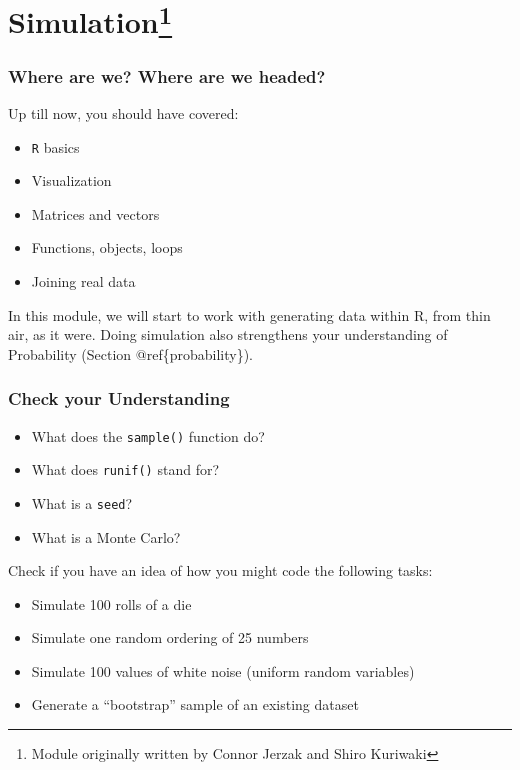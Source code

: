 \documentclass[]{book}
\providecommand{\tightlist}{%
  \setlength{\itemsep}{0pt}\setlength{\parskip}{0pt}}
\let\rmarkdownfootnote\footnote%
\def\footnote{\protect\rmarkdownfootnote}
\theoremstyle{definition}
\theoremstyle{definition}
\theoremstyle{definition}
\theoremstyle{remark}
\begin{document}
\chapter[Simulation]{\texorpdfstring{Simulation\footnote{Module
  originally written by Connor Jerzak and Shiro Kuriwaki}}{Simulation}}\label{simulation}

\subsection*{Where are we? Where are we
headed?}\label{where-are-we-where-are-we-headed-5}

Up till now, you should have covered:

\begin{itemize}
\tightlist
\item
  \texttt{R} basics
\item
  Visualization
\item
  Matrices and vectors
\item
  Functions, objects, loops
\item
  Joining real data
\end{itemize}

In this module, we will start to work with generating data within R,
from thin air, as it were. Doing simulation also strengthens your
understanding of Probability (Section @ref\{probability\}).

\subsection*{Check your Understanding}\label{check-your-understanding-2}

\begin{itemize}
\tightlist
\item
  What does the \texttt{sample()} function do?
\item
  What does \texttt{runif()} stand for?
\item
  What is a \texttt{seed}?
\item
  What is a Monte Carlo?
\end{itemize}

Check if you have an idea of how you might code the following tasks:

\begin{itemize}
\tightlist
\item
  Simulate 100 rolls of a die
\item
  Simulate one random ordering of 25 numbers
\item
  Simulate 100 values of white noise (uniform random variables)
\item
  Generate a ``bootstrap'' sample of an existing dataset
\end{itemize}
\end{document}

